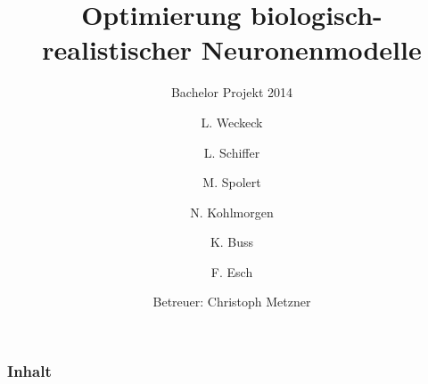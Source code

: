 \documentclass[12pt]{beamer}
\title{Optimierung biologisch-realistischer Neuronenmodelle}
\subtitle{Bachelor Projekt 2014}
\author{L. Weckeck \and L. Schiffer \and M. Spolert \and N. Kohlmorgen \and K. Buss \and F. Esch}
\institute{
  Institut für Robotik und Kognitive Systeme\\
  Universität zu Lübeck
}
\date{Betreuer: Christoph Metzner}
\begin{document}
\begin{frame}
  \titlepage
\end{frame}

\begin{frame}
  \frametitle{Inhalt}
  \tableofcontents
\end{frame}




\end{document}
